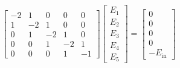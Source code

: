 \begin{solution}
\begin{align*}
\begin{bmatrix}
-2 & 1 & 0 & 0 & 0 \\
1 & -2 & 1 & 0 & 0 \\
0 & 1 & -2 & 1 & 0 \\
0 & 0 & 1 & -2 & 1 \\
0 & 0 & 0 & 1 & -1
\end{bmatrix}
\begin{bmatrix}
E_1 \\
E_2 \\
E_3 \\
E_4 \\
E_5
\end{bmatrix}
=
\begin{bmatrix}
0 \\
0 \\
0 \\
0 \\
-E_{\text{in}} 
\end{bmatrix}
\end{align*}
\end{solution}

